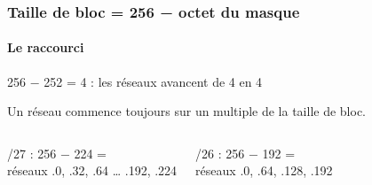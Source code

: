 \documentclass[aspectratio=169,10pt]{beamer}
\begin{document}
\begin{frame}
\frametitle{Taille de bloc = 256 − octet du masque}
\framesubtitle{Le raccourci}
\begin{carte}[tag=/30]{256 − 252 = 4 : les réseaux avancent de 4 en 4}
\centering
{}\par\medskip
\small Un réseau commence toujours sur un multiple de la taille de bloc.
\end{carte}
\vfill
\begin{columns}[T]
\begin{callout}[or]\small /27 : 256 − 224 =  \\ réseaux .0, .32, .64 … .192, .224\end{callout}
\begin{callout}[rose]\small /26 : 256 − 192 =  \\ réseaux .0, .64, .128, .192\end{callout}
\end{columns}
\end{frame}
\end{document}
